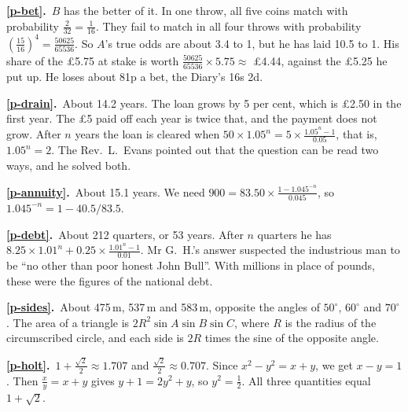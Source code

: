 \documentclass[11pt,a4paper]{article}
\newcounter{prob}
\newcommand{\ans}[2]{\par\smallskip\noindent\textbf{\ref{#1}.}\ #2}
\begin{document}
\ans{p-bet}{$B$ has the better of it. In one throw, all five coins match with probability
$\tfrac2{32} = \tfrac1{16}$. They fail to match in all four throws with probability
$\left(\tfrac{15}{16}\right)^4 = \tfrac{50625}{65536}$. So $A$'s true odds are about 3.4 to 1,
but he has laid 10.5 to 1. His share of the \pounds5.75 at stake is worth
$\tfrac{50625}{65536}\times5.75 \approx$ \pounds4.44, against the \pounds5.25 he put up. He loses
about 81p a bet, the Diary's 16s 2d.}
\ans{p-drain}{About 14.2 years. The loan grows by 5 per cent, which is \pounds2.50 in the first
year. The \pounds5 paid off each year is twice that, and the payment does not grow. After $n$
years the loan is cleared when $50\times1.05^n = 5\times\tfrac{1.05^n - 1}{0.05}$, that
is, $1.05^n = 2$. The Rev.~L.~Evans pointed out that the question can be read two ways,
and he solved both.}
\ans{p-annuity}{About 15.1 years. We need
$900 = 83.50\times\tfrac{1 - 1.045^{-n}}{0.045}$, so $1.045^{-n} = 1 - 40.5/83.5$.}
\ans{p-debt}{About 212 quarters, or 53 years. After $n$ quarters he has
$8.25\times1.01^n + 0.25\times\tfrac{1.01^n - 1}{0.01}$. Mr G.~H.'s answer suspected the
industrious man to be ``no other than poor honest John Bull''. With millions in place of
pounds, these were the figures of the national debt.}
\ans{p-sides}{About 475\,m, 537\,m and 583\,m, opposite the angles of $50^\circ$, $60^\circ$
and $70^\circ$. The area of a triangle is $2R^2\sin A\sin B\sin C$, where $R$ is the radius
of the circumscribed circle, and each side is $2R$ times the sine of the opposite angle.}
\ans{p-holt}{$1 + \tfrac{\sqrt2}{2} \approx 1.707$ and $\tfrac{\sqrt2}{2} \approx 0.707$.
Since $x^2 - y^2 = x + y$, we get $x - y = 1$. Then $\tfrac xy = x + y$ gives
$y + 1 = 2y^2 + y$, so $y^2 = \tfrac12$. All three quantities equal $1 + \sqrt2$.}
\end{document}
